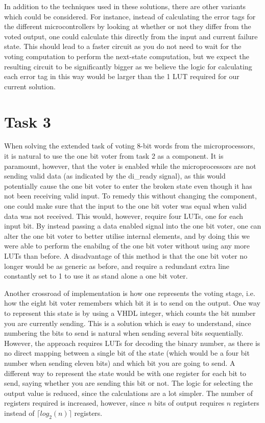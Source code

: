 \documentclass[11pt]{article}
\begin{document}
In addition to the techniques used in these solutions, there are other
variants which could be considered. For instance, instead of
calculating the error tags for the different microcontrollers by
looking at whether or not they differ from the voted output, one could
calculate this directly from the input and current failure state. This
should lead to a faster circuit as you do not need to wait for the
voting computation to perform the next-state computation, but we
expect the resulting circuit to be significantly bigger as we believe
the logic for calculating each error tag in this way would be larger
than the 1 LUT required for our current solution.

\section{Task 3}
\label{sec:task3}

When solving the extended task of voting 8-bit words from the
microprocessors, it is natural to use the one bit voter from task 2 as
a component. It is paramount, however, that the voter is enabled while
the microprocessors are not sending valid data (as indicated by the
di\_ready signal), as this would potentially cause the one bit voter
to enter the broken state even though it has not been receiving valid
input. To remedy this without changing the component, one could make
sure that the input to the one bit voter was equal when valid data was
not received. This would, however, require four LUTs, one for each
input bit. By instead passing a data enabled signal into the one bit
voter, one can alter the one bit voter to better utilise internal
elements, and by doing this we were able to perform the enabilng of
the one bit voter without using any more LUTs than before. A
disadvantage of this method is that the one bit voter no longer would
be as generic as before, and require a redundant extra line constantly
set to 1 to use it as stand alone a one bit voter.

Another crossroad of implementation is how one represents the voting
stage, i.e. how the eight bit voter remembers which bit it is to send
on the output. One way to represent this state is by using a VHDL
integer, which counts the bit number you are currently sending. This
is a solution which is easy to understand, since numbering the bits to
send is natural when sending several bits sequentially. However, the
approach requires LUTs for decoding the binary number, as there is no
direct mapping between a single bit of the state (which would be a
four bit number when sending eleven bits) and which bit you are going
to send. A different way to represent the state would be with one
register for each bit to send, saying whether you are sending this bit
or not. The logic for selecting the output value is reduced, since the
calculations are a lot simpler. The number of registers required is
increased, however, since $n$ bits of output requires $n$ registers
instead of $\lceil log_2(n) \rceil$ registers.
\end{document}
